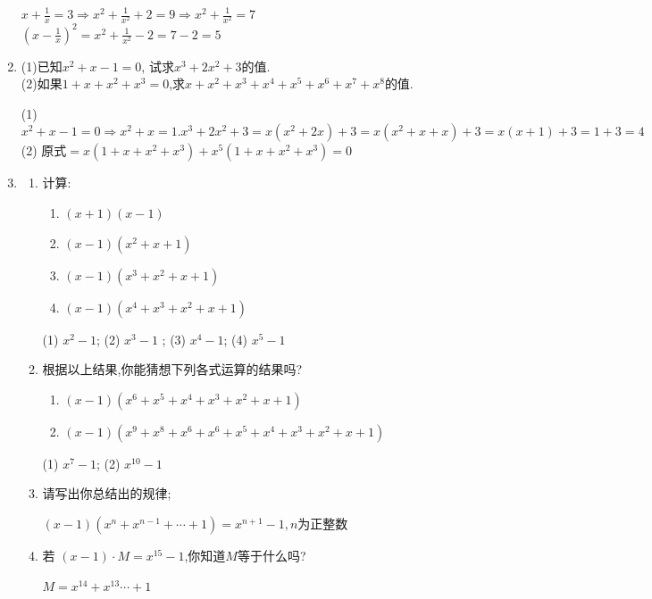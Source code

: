 \documentclass[cn,blue,12pt]{elegantbook}
\begin{document}
\begin{enumerate}
\begin{solution}
                \(x+\frac{1}{x}=3 \Rightarrow x^2+\frac{1}{x^2}+2=9 \Rightarrow x^2+\frac{1}{x^2}=7\)\\
                \((x-\frac{1}{x})^2=x^2+\frac{1}{x^2}-2=7-2=5\)
\end{solution}
        \item (1)已知\(x^2+x-1=0\), 试求\(x^3+2x^2+3\)的值.\\
            (2)如果\(1+x+x^2+x^3=0\),求\(x+x^2+x^3+x^4+x^5+x^6+x^7+x^8\)的值.
\begin{solution}
                (1) \(x^2+x-1=0 \Rightarrow x^2+x=1. x^3+2x^2+3=x(x^2+2x)+3=x(x^2+x+x)+3=x(x+1)+3=1+3=4\)\\
                (2) 原式\(=x(1+x+x^2+x^3)+x^5(1+x+x^2+x^3)=0\)
\end{solution}
        \item
            \begin{enumerate}
                \item 计算:
                \begin{enumerate}
                    \item \((x+1)(x-1)\)
                    \item \((x-1)(x^2+x+1)\)
                    \item \((x-1)(x^3+x^2+x+1)\)
                    \item \((x-1)(x^4+x^3+x^2+x+1)\)
                \end{enumerate}
\begin{solution}
                    (1) \(x^2 -1\); (2) \(x^3-1\) ; (3) \(x^4-1\); (4) \(x^5-1\)
\end{solution}
            \item 根据以上结果,你能猜想下列各式运算的结果吗?
                \begin{enumerate}
                    \item \((x-1)(x^6+x^5+x^4+x^3+x^2+x+1)\)
                    \item \((x-1)(x^9+x^8+x^6+x^6+x^5+x^4+x^3+x^2+x+1)\)
                \end{enumerate}
\begin{solution}
                    (1) \(x^7-1\); (2) \(x^{10}-1\)
\end{solution}
            \item 请写出你总结出的规律;
\begin{solution}
                    \((x-1)(x^n+x^{n-1}+\cdots +1)=x^{n+1}-1,n\)为正整数
\end{solution}
            \item 若 \((x-1)\cdot M = x^{15}-1\),你知道\( M \)等于什么吗?
\begin{solution}
                    \(M=x^{14}+x^{13}\cdots +1\)
\end{solution}
        \end{enumerate}
    \end{enumerate}
    
\end{document}

